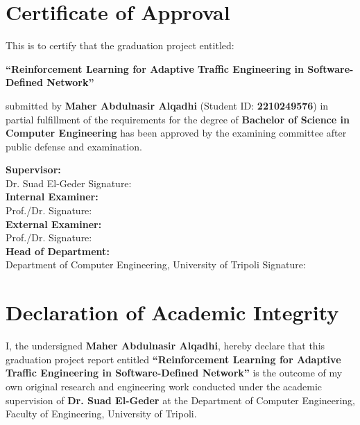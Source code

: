 \documentclass[12pt,a4paper,oneside]{report}
\begin{document}
\chapter*{Certificate of Approval}

This is to certify that the graduation project entitled:
\begin{center}
    \vspace{2mm}
    \textbf{\large ``Reinforcement Learning for Adaptive Traffic Engineering in Software-Defined Network''}
    \vspace{2mm}
\end{center}
submitted by \textbf{Maher Abdulnasir Alqadhi} (Student ID: \textbf{2210249576}) in partial fulfillment of the requirements for the degree of \textbf{Bachelor of Science in Computer Engineering} has been approved by the examining committee after public defense and examination.

\vspace{1.5cm}

\noindent
\textbf{Supervisor:}\\
Dr. Suad El-Geder \hfill Signature: \dotfill \\[0.8cm]
\textbf{Internal Examiner:}\\
Prof./Dr. \dotfill \hfill Signature: \dotfill \\[0.8cm]
\textbf{External Examiner:}\\
Prof./Dr. \dotfill \hfill Signature: \dotfill \\[0.8cm]
\textbf{Head of Department:}\\
Department of Computer Engineering, University of Tripoli \hfill Signature: \dotfill

\vfill

\clearpage

\chapter*{Declaration of Academic Integrity}

I, the undersigned \textbf{Maher Abdulnasir Alqadhi}, hereby declare that this graduation project report entitled \textbf{``Reinforcement Learning for Adaptive Traffic Engineering in Software-Defined Network''} is the outcome of my own original research and engineering work conducted under the academic supervision of \textbf{Dr. Suad El-Geder} at the Department of Computer Engineering, Faculty of Engineering, University of Tripoli.
\end{document}

